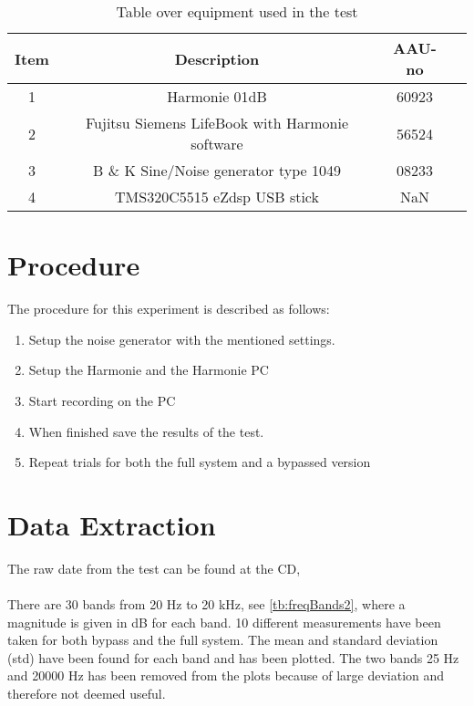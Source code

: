 \begin{table}[H]
\centering
{}
\begin{tabular}{S[table-format=1]ccc} \toprule
    {Item} & {Description} & {AAU-no} \\       &  Harmonie 01dB  & 60923  \\ 
    2      &  Fujitsu Siemens LifeBook with Harmonie software  & 56524  \\ 
    3      &  B \& K Sine/Noise generator type 1049  & 08233  \\ 
    4      &  TMS320C5515 eZdsp USB stick  & NaN  \\  \bottomrule 
\end{tabular}
\caption{Table over equipment used in the test}
\label{tab:UsedEquipmentFreqResponseActual}
\end{table}
\vspace{-5mm}


\section{Procedure}
The procedure for this experiment is described as follows:
\vspace{-5mm}
\begin{enumerate}\addtolength{\itemsep}{-.35\baselineskip} 
\item Setup the noise generator with the mentioned settings.
\item Setup the Harmonie and the Harmonie PC
\item Start recording on the PC
\item When finished save the results of the test.
\item Repeat trials for both the full system and a bypassed version
\end{enumerate}

\section{Data Extraction}
The raw date from the test can be found at the CD, \\ 
\\
There are 30 bands from 20 Hz to 20 kHz, see \autoref{tb:freqBands2}, where a magnitude is given in dB for each band. 10 different measurements have been taken for both bypass and the full system. The mean and standard deviation (std) have been found for each band and has been plotted. The two bands 25 Hz and 20000 Hz has been removed from the plots because of large deviation and therefore not deemed useful.

